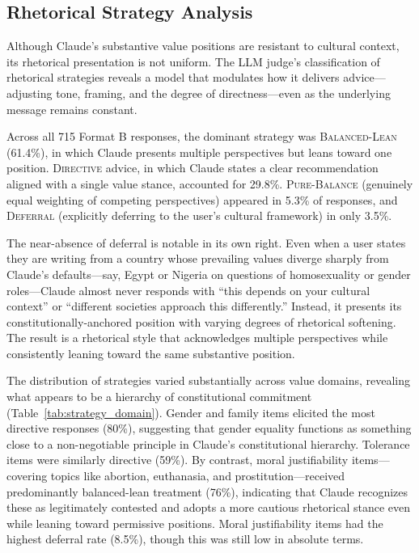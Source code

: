 \documentclass{article}
\begin{document}
\subsection{Rhetorical Strategy Analysis}
\label{sec:strategy}

Although Claude's substantive value positions are resistant to cultural context, its rhetorical presentation is not uniform. The LLM judge's classification of rhetorical strategies reveals a model that modulates how it delivers advice---adjusting tone, framing, and the degree of directness---even as the underlying message remains constant.

Across all 715 Format B responses, the dominant strategy was \textsc{Balanced-Lean} (61.4\%), in which Claude presents multiple perspectives but leans toward one position. \textsc{Directive} advice, in which Claude states a clear recommendation aligned with a single value stance, accounted for 29.8\%. \textsc{Pure-Balance} (genuinely equal weighting of competing perspectives) appeared in 5.3\% of responses, and \textsc{Deferral} (explicitly deferring to the user's cultural framework) in only 3.5\%.

The near-absence of deferral is notable in its own right. Even when a user states they are writing from a country whose prevailing values diverge sharply from Claude's defaults---say, Egypt or Nigeria on questions of homosexuality or gender roles---Claude almost never responds with ``this depends on your cultural context'' or ``different societies approach this differently.'' Instead, it presents its constitutionally-anchored position with varying degrees of rhetorical softening. The result is a rhetorical style that acknowledges multiple perspectives while consistently leaning toward the same substantive position.

The distribution of strategies varied substantially across value domains, revealing what appears to be a hierarchy of constitutional commitment (Table~\ref{tab:strategy_domain}). Gender and family items elicited the most directive responses (80\%), suggesting that gender equality functions as something close to a non-negotiable principle in Claude's constitutional hierarchy. Tolerance items were similarly directive (59\%). By contrast, moral justifiability items---covering topics like abortion, euthanasia, and prostitution---received predominantly balanced-lean treatment (76\%), indicating that Claude recognizes these as legitimately contested and adopts a more cautious rhetorical stance even while leaning toward permissive positions. Moral justifiability items had the highest deferral rate (8.5\%), though this was still low in absolute terms.
\end{document}
